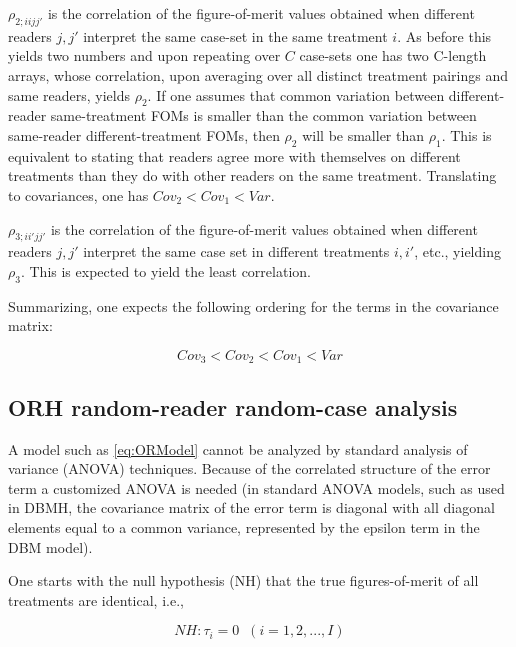 \documentclass[
]{book}
\begin{document}
\(\rho_{2;iijj'}\) is the correlation of the figure-of-merit values obtained when different readers \(j,j'\) interpret the same case-set in the same treatment \(i\). As before this yields two numbers and upon repeating over \(C\) case-sets one has two C-length arrays, whose correlation, upon averaging over all distinct treatment pairings and same readers, yields \(\rho_2\). If one assumes that common variation between different-reader same-treatment FOMs is smaller than the common variation between same-reader different-treatment FOMs, then \(\rho_2\) will be smaller than \(\rho_1\). This is equivalent to stating that readers agree more with themselves on different treatments than they do with other readers on the same treatment. Translating to covariances, one has \(Cov_2 < Cov_1 < Var\).

\(\rho_{3;ii'jj'}\) is the correlation of the figure-of-merit values obtained when different readers \(j,j'\) interpret the same case set in different treatments \(i,i'\), etc., yielding \(\rho_3\). This is expected to yield the least correlation.

Summarizing, one expects the following ordering for the terms in the covariance matrix:

\begin{equation}
Cov_3 < Cov_2 < Cov_1 < Var
\label{eq:CovOrderings}
\end{equation}

\hypertarget{orh-random-reader-random-case-analysis}{%
\subsection{ORH random-reader random-case analysis}\label{orh-random-reader-random-case-analysis}}

A model such as \eqref{eq:ORModel} cannot be analyzed by standard analysis of variance (ANOVA) techniques. Because of the correlated structure of the error term a customized ANOVA is needed (in standard ANOVA models, such as used in DBMH, the covariance matrix of the error term is diagonal with all diagonal elements equal to a common variance, represented by the epsilon term in the DBM model).

One starts with the null hypothesis (NH) that the true figures-of-merit of all treatments are identical, i.e.,

\begin{equation}
NH:\tau_i=0\;\;  (i=1,2,...,I)
\label{eq:ORModelNH}
\end{equation}
\end{document}
